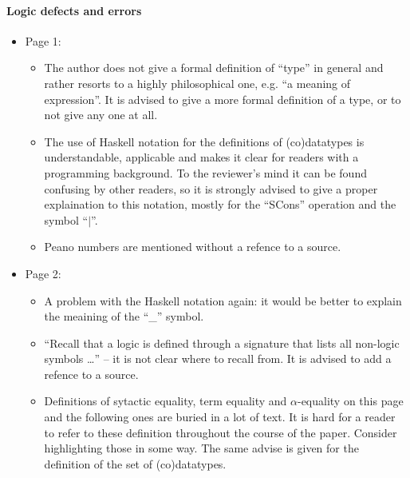 \paragraph{Logic defects and errors}
\begin{itemize}
	\item Page 1:
	\begin{itemize}
		\item The author does not give a formal definition of ``type'' in general and rather resorts to a highly philosophical one, e.g. ``a meaning of expression''. It is advised to give a more formal definition of a type, or to not give any one at all.
		\item The use of Haskell notation for the definitions of (co)datatypes is understandable, applicable and makes it clear for readers with a programming background. To the reviewer's mind it can be found confusing by other readers, so it is strongly advised to give a proper explaination to this notation, mostly for the ``SCons'' operation and the symbol ``$|$''.
		\item Peano numbers are mentioned without a refence to a source.
	\end{itemize} 

	\item Page 2:
	\begin{itemize}
		\item A problem with the Haskell notation again: it would be better to explain the meaining of the ``\_'' symbol.
		\item ``Recall that a logic is deﬁned through a signature that lists all non-logic symbols \dots'' -- it is not clear where to recall from. It is advised to add a refence to a source.
		\item Definitions of sytactic equality, term equality and $\alpha$-equality on this page and the following ones are buried in a lot of text. It is hard for a reader to refer to these definition throughout the course of the paper. Consider highlighting those in some way. The same advise is given for the definition of the set of (co)datatypes.
	\end{itemize}


\end{itemize}
